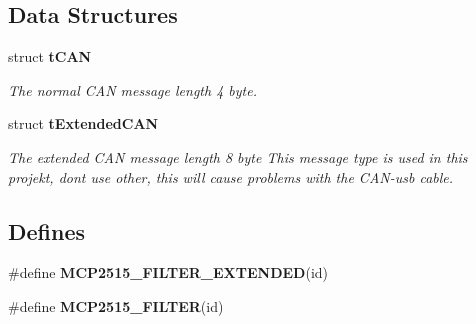 \subsection*{\-Data \-Structures}
\begin{DoxyCompactItemize}
\item 
struct {\bf t\-C\-A\-N}
\begin{DoxyCompactList}\small\item\em \-The normal \-C\-A\-N message length 4 byte. \end{DoxyCompactList}\item 
struct {\bf t\-Extended\-C\-A\-N}
\begin{DoxyCompactList}\small\item\em \-The extended \-C\-A\-N message length 8 byte \-This message type is used in this projekt, dont use other, this will cause problems with the \-C\-A\-N-\/usb cable. \end{DoxyCompactList}\end{DoxyCompactItemize}
\subsection*{\-Defines}
\begin{DoxyCompactItemize}
\item 
\#define {\bfseries \-M\-C\-P2515\-\_\-\-F\-I\-L\-T\-E\-R\-\_\-\-E\-X\-T\-E\-N\-D\-E\-D}(id)
\item 
\#define {\bfseries \-M\-C\-P2515\-\_\-\-F\-I\-L\-T\-E\-R}(id)
\end{DoxyCompactItemize}
